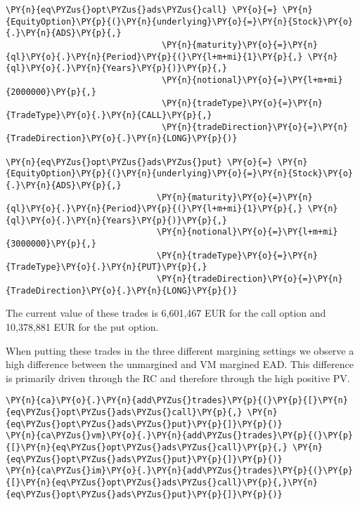     \begin{tcolorbox}[breakable, size=fbox, boxrule=1pt, pad at break*=1mm,colback=cellbackground, colframe=cellborder]
\begin{Verbatim}[commandchars=\\\{\}]
\PY{n}{eq\PYZus{}opt\PYZus{}ads\PYZus{}call} \PY{o}{=} \PY{n}{EquityOption}\PY{p}{(}\PY{n}{underlying}\PY{o}{=}\PY{n}{Stock}\PY{o}{.}\PY{n}{ADS}\PY{p}{,}
                               \PY{n}{maturity}\PY{o}{=}\PY{n}{ql}\PY{o}{.}\PY{n}{Period}\PY{p}{(}\PY{l+m+mi}{1}\PY{p}{,} \PY{n}{ql}\PY{o}{.}\PY{n}{Years}\PY{p}{)}\PY{p}{,}
                               \PY{n}{notional}\PY{o}{=}\PY{l+m+mi}{2000000}\PY{p}{,}
                               \PY{n}{tradeType}\PY{o}{=}\PY{n}{TradeType}\PY{o}{.}\PY{n}{CALL}\PY{p}{,}
                               \PY{n}{tradeDirection}\PY{o}{=}\PY{n}{TradeDirection}\PY{o}{.}\PY{n}{LONG}\PY{p}{)}

\PY{n}{eq\PYZus{}opt\PYZus{}ads\PYZus{}put} \PY{o}{=} \PY{n}{EquityOption}\PY{p}{(}\PY{n}{underlying}\PY{o}{=}\PY{n}{Stock}\PY{o}{.}\PY{n}{ADS}\PY{p}{,}
                              \PY{n}{maturity}\PY{o}{=}\PY{n}{ql}\PY{o}{.}\PY{n}{Period}\PY{p}{(}\PY{l+m+mi}{1}\PY{p}{,} \PY{n}{ql}\PY{o}{.}\PY{n}{Years}\PY{p}{)}\PY{p}{,}
                              \PY{n}{notional}\PY{o}{=}\PY{l+m+mi}{3000000}\PY{p}{,}
                              \PY{n}{tradeType}\PY{o}{=}\PY{n}{TradeType}\PY{o}{.}\PY{n}{PUT}\PY{p}{,}
                              \PY{n}{tradeDirection}\PY{o}{=}\PY{n}{TradeDirection}\PY{o}{.}\PY{n}{LONG}\PY{p}{)}
\end{Verbatim}
\end{tcolorbox}

    The current value of these trades is 6,601,467 EUR for the call option
and 10,378,881 EUR for the put option.

    
    When putting these trades in the three different margining settings we observe a high
difference between the unmargined and VM margined EAD. This difference
is primarily driven through the RC and therefore through the high
positive PV.

    \begin{tcolorbox}[breakable, size=fbox, boxrule=1pt, pad at break*=1mm,colback=cellbackground, colframe=cellborder]
\begin{Verbatim}[commandchars=\\\{\}]
\PY{n}{ca}\PY{o}{.}\PY{n}{add\PYZus{}trades}\PY{p}{(}\PY{p}{[}\PY{n}{eq\PYZus{}opt\PYZus{}ads\PYZus{}call}\PY{p}{,} \PY{n}{eq\PYZus{}opt\PYZus{}ads\PYZus{}put}\PY{p}{]}\PY{p}{)}
\PY{n}{ca\PYZus{}vm}\PY{o}{.}\PY{n}{add\PYZus{}trades}\PY{p}{(}\PY{p}{[}\PY{n}{eq\PYZus{}opt\PYZus{}ads\PYZus{}call}\PY{p}{,} \PY{n}{eq\PYZus{}opt\PYZus{}ads\PYZus{}put}\PY{p}{]}\PY{p}{)}
\PY{n}{ca\PYZus{}im}\PY{o}{.}\PY{n}{add\PYZus{}trades}\PY{p}{(}\PY{p}{[}\PY{n}{eq\PYZus{}opt\PYZus{}ads\PYZus{}call}\PY{p}{,}\PY{n}{eq\PYZus{}opt\PYZus{}ads\PYZus{}put}\PY{p}{]}\PY{p}{)}
\end{Verbatim}
\end{tcolorbox}


